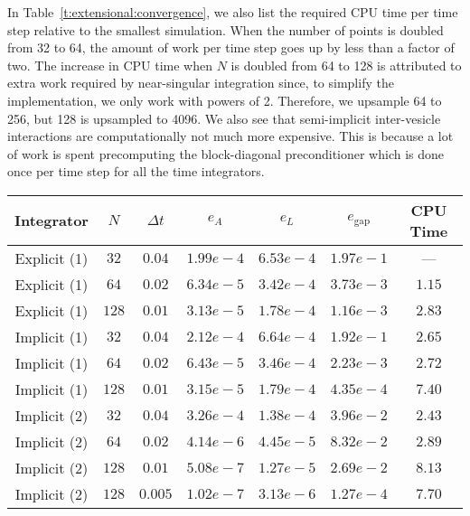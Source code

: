 In Table~\ref{t:extensional:convergence}, we also list the required CPU
time per time step relative to the smallest simulation.  When the
number of points is doubled from 32 to 64, the amount of work per time
step goes up by less than a factor of two.  The increase in CPU time
when $N$ is doubled from 64 to 128 is attributed to extra work required
by near-singular integration since, to simplify the implementation, we
only work with powers of 2.  Therefore, we upsample 64 to 256, but 128
is upsampled to 4096.  We also see that semi-implicit inter-vesicle
interactions are computationally not much more expensive.  This is
because a lot of work is spent precomputing the block-diagonal
preconditioner which is done once per time step for all the time
integrators.

\begin{table}[htp] 
\begin{centering} 
\begin{tabular}{ccccccc} 
Integrator & $N$ &   $\Delta t$ & $e_{A}$ & $e_{L}$ & $e_{\mathrm{gap}}$ & CPU Time \\ \hline
Explicit (1) & $32$  & $0.04$ & $1.99e-4$ & $6.53e-4$ & $1.97e-1$ & --- \\  
Explicit (1) & $64$  & $0.02$ & $6.34e-5$ & $3.42e-4$ & $3.73e-3$ & $1.15$ \\ 
Explicit (1) & $128$ & $0.01$ & $3.13e-5$ & $1.78e-4$ & $1.16e-3$ & $2.83$ \\ 
\hline
Implicit (1) & $32$  & $0.04$ & $2.12e-4$ & $6.64e-4$ & $1.92e-1$ & $2.65$ \\  
Implicit (1) & $64$  & $0.02$ & $6.43e-5$ & $3.46e-4$ & $2.23e-3$ & $2.72$ \\ 
Implicit (1) & $128$ & $0.01$ & $3.15e-5$ & $1.79e-4$ & $4.35e-4$ & $7.40$ \\ 
\hline
Implicit (2) & $32$  & $0.04$ & $3.26e-4$ & $1.38e-4$ & $3.96e-2$ & $2.43$ \\  
Implicit (2) & $64$  & $0.02$ & $4.14e-6$ & $4.45e-5$ & $8.32e-2$ & $2.89$ \\ 
Implicit (2) & $128$ & $0.01$ & $5.08e-7$ & $1.27e-5$ & $2.69e-2$ & $8.13$ \\
Implicit (2) & $128$ & $0.005$& $1.02e-7$ & $3.13e-6$ & $1.27e-4$ & $7.70$ \\
\end{tabular}
\end{centering}
\end{table}



